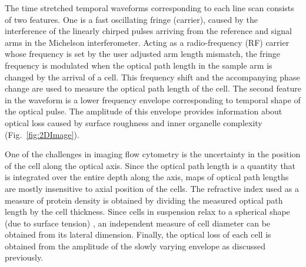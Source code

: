 \documentclass[aps,pra,reprint,longbibliography,superscriptaddress]{revtex4-1}
\begin{document}
\begin{figure*}
\caption{\label{fig:2DImage} Quantitative phase and optical loss images of \textit{OT-II} (blue) and \textit{SW-480} (green box) cells; The optical loss images of the cells are affected by the attenuation of multiplexed wavelength components passing through the cells. The attenuation itself is governed by the absorption of the light in cells as well as the scattering from the surface of the cells and from the internal cell organelles. The optical loss image is derived from the low frequency features of the pulse interferograms. The optical phase image is extracted from the analytic form of the high frequency features of the pulse interferograms using Hilbert Transformation, followed by a phase unwrapping algorithm. Details of these derivations can be found in Section \ref{scn:Methods}. Also, Videos 1 and 2 show measurements of cell-induced optical path length difference by TS-QPI at four different points along the rainbow for \textit{OT-II} and \textit{SW-480}, respectively.}
\end{figure*}

The time stretched temporal waveforms corresponding to each line scan consists of two features. One is a fast oscillating fringe (carrier), caused by the interference of the linearly chirped pulses arriving from the reference and signal arms in the Michelson interferometer. Acting as a radio-frequency (RF) carrier whose frequency is set by the user adjusted arm length mismatch, the fringe frequency is modulated when the optical path length in the sample arm is changed by the arrival of a cell. This frequency shift and the accompanying phase change are used to measure the optical path length of the cell. The second feature in the waveform is a lower frequency envelope corresponding to temporal shape of the optical pulse. The amplitude of this envelope provides information about optical loss caused by surface roughness and inner organelle complexity (Fig.~\ref{fig:2DImage}). 

One of the challenges in imaging flow cytometry is the uncertainty in the position of the cell along the optical axis. Since the optical path length is a quantity that is integrated over the entire depth along the axis, maps of optical path lengths are mostly insensitive to axial position of the cells. The refractive index used as a measure of protein density is obtained by dividing the measured optical path length by the cell thickness. Since cells in suspension relax to a spherical shape (due to surface tension) \cite{revel1974adhesion,whur1977substrate}, an independent measure of cell diameter can be obtained from its lateral dimension. Finally, the optical loss of each cell is obtained from the amplitude of the slowly varying envelope as discussed previously.
\end{document}
